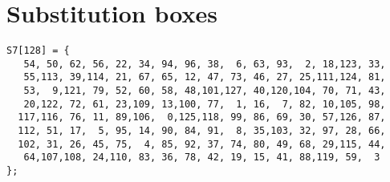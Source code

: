 \section{Substitution boxes}
\label{sec:subbox}
\begin{lstlisting}[caption={S7 substitution box}, frame=single,
breaklines=true]
S7[128] = {
   54, 50, 62, 56, 22, 34, 94, 96, 38,  6, 63, 93,  2, 18,123, 33,
   55,113, 39,114, 21, 67, 65, 12, 47, 73, 46, 27, 25,111,124, 81,
   53,  9,121, 79, 52, 60, 58, 48,101,127, 40,120,104, 70, 71, 43,
   20,122, 72, 61, 23,109, 13,100, 77,  1, 16,  7, 82, 10,105, 98,
  117,116, 76, 11, 89,106,  0,125,118, 99, 86, 69, 30, 57,126, 87,
  112, 51, 17,  5, 95, 14, 90, 84, 91,  8, 35,103, 32, 97, 28, 66,
  102, 31, 26, 45, 75,  4, 85, 92, 37, 74, 80, 49, 68, 29,115, 44,
   64,107,108, 24,110, 83, 36, 78, 42, 19, 15, 41, 88,119, 59,  3
};
\end{lstlisting}
